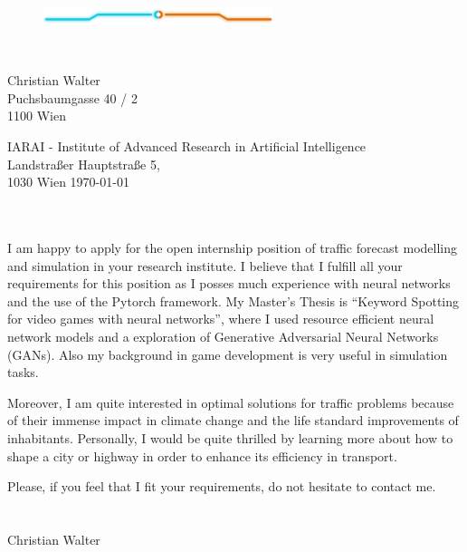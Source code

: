 \documentclass[11pt, a4paper]{article}
\begin{document}
\begin{center}
  \begin{figure}[h] \centering \includegraphics[width=0.6\textwidth]{tron_blue_orange_up} \end{figure}
  \\
\end{center}

\vspace{1cm}
Christian Walter\\
Puchsbaumgasse 40 / 2\\
1100 Wien\\
\vspace{1cm}

IARAI - Institute of Advanced Research in Artificial Intelligence\\
Landstraßer Hauptstraße 5, \\
1030 Wien \hfill
\today\\
\vspace{1cm}

\\\\
I am happy to apply for the open internship position of traffic forecast modelling and simulation in your research institute.
I believe that I fulfill all your requirements for this position as I posses much experience with neural networks and the use of the Pytorch framework.
My Master's Thesis is \enquote{Keyword Spotting for video games with neural networks}, where I used resource efficient neural network models and a exploration of Generative Adversarial Neural Networks (GANs).
Also my background in game development is very useful in simulation tasks.

Moreover, I am quite interested in optimal solutions for traffic problems because of their immense impact in climate change and the life standard improvements of inhabitants.
Personally, I would be quite thrilled by learning more about how to shape a city or highway in order to enhance its efficiency in transport.

Please, if you feel that I fit your requirements, do not hesitate to contact me.\\

\\\\ Christian Walter
\end{document}
